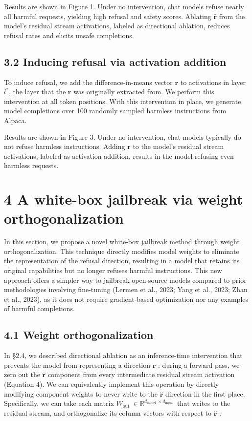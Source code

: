 \documentclass[10pt]{article}
\begin{document}
Results are shown in Figure 1. Under no intervention, chat models refuse nearly all harmful requests, yielding high refusal and safety scores. Ablating $\hat{\mathbf{r}}$ from the model's residual stream activations, labeled as directional ablation, reduces refusal rates and elicits unsafe completions.

\subsection*{3.2 Inducing refusal via activation addition}
To induce refusal, we add the difference-in-means vector $\mathbf{r}$ to activations in layer $l^{*}$, the layer that the $\mathbf{r}$ was originally extracted from. We perform this intervention at all token positions. With this intervention in place, we generate model completions over 100 randomly sampled harmless instructions from Alpaca.

Results are shown in Figure 3. Under no intervention, chat models typically do not refuse harmless instructions. Adding $\mathbf{r}$ to the model's residual stream activations, labeled as activation addition, results in the model refusing even harmless requests.

\section*{4 A white-box jailbreak via weight orthogonalization}
In this section, we propose a novel white-box jailbreak method through weight orthogonalization. This technique directly modifies model weights to eliminate the representation of the refusal direction, resulting in a model that retains its original capabilities but no longer refuses harmful instructions. This new approach offers a simpler way to jailbreak open-source models compared to prior methodologies involving fine-tuning (Lermen et al., 2023; Yang et al., 2023; Zhan et al., 2023), as it does not require gradient-based optimization nor any examples of harmful completions.

\subsection*{4.1 Weight orthogonalization}
In §2.4, we described directional ablation as an inference-time intervention that prevents the model from representing a direction $\hat{\mathbf{r}}$ : during a forward pass, we zero out the $\hat{\mathbf{r}}$ component from every intermediate residual stream activation (Equation 4). We can equivalently implement this operation by directly modifying component weights to never write to the $\hat{\mathbf{r}}$ direction in the first place. Specifically, we can take each matrix $W_{\text {out }} \in \mathbb{R}^{d_{\text {model }} \times d_{\text {input }}}$ that writes to the residual stream, and orthogonalize its column vectors with respect to $\hat{\mathbf{r}}$ :
\end{document}
